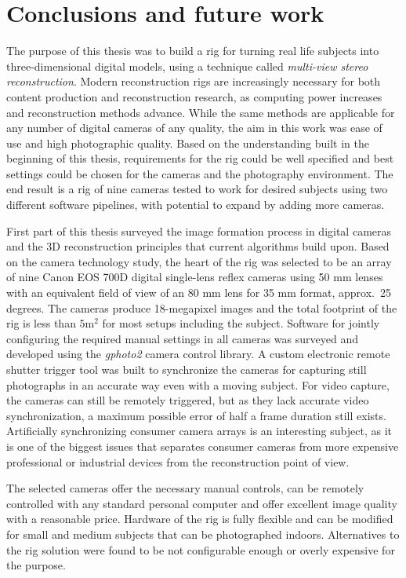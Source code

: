 \section{Conclusions and future work} \label{sec:conclusion}

The purpose of this thesis was to build a rig for turning real life subjects into three-dimensional digital models, using a technique called \emph{multi-view stereo reconstruction}.
Modern reconstruction rigs are increasingly necessary for both content production and reconstruction research, as computing power increases and reconstruction methods advance.
While the same methods are applicable for any number of digital cameras of any quality, the aim in this work was ease of use and high photographic quality.
Based on the understanding built in the beginning of this thesis, requirements for the rig could be well specified and best settings could be chosen for the cameras and the photography environment.
The end result is a rig of nine cameras tested to work for desired subjects using two different software pipelines, with potential to expand by adding more cameras.

First part of this thesis surveyed the image formation process in digital cameras and the 3D reconstruction principles that current algorithms build upon.
Based on the camera technology study, the heart of the rig was selected to be an array of nine Canon EOS 700D digital single-lens reflex cameras using 50 mm lenses with an equivalent field of view of an 80 mm lens for 35 mm format, approx.~25 degrees.
The cameras produce 18-megapixel images and the total footprint of the rig is less than $5 \text{m}^2$ for most setups including the subject.
Software for jointly configuring the required manual settings in all cameras was surveyed and developed using the \emph{gphoto2} camera control library.
A custom electronic remote shutter trigger tool was built to synchronize the cameras for capturing still photographs in an accurate way even with a moving subject.
For video capture, the cameras can still be remotely triggered, but as they lack accurate video synchronization, a maximum possible error of half a frame duration still exists.
Artificially synchronizing consumer camera arrays is an interesting subject, as it is one of the biggest issues that separates consumer cameras from more expensive professional or industrial devices from the reconstruction point of view.

The selected cameras offer the necessary manual controls, can be remotely controlled with any standard personal computer and offer excellent image quality with a reasonable price.
Hardware of the rig is fully flexible and can be modified for small and medium subjects that can be photographed indoors.
Alternatives to the rig solution were found to be not configurable enough or overly expensive for the purpose.

